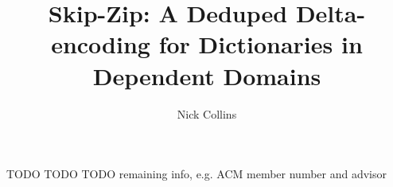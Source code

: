 \documentclass[nonacm]{acmart}
\theoremstyle{slplain}
\numberwithin{thm}{section}
\begin{document}
\title{Skip-Zip: A Deduped Delta-encoding for Dictionaries in Dependent Domains}


\author{Nick Collins}


TODO TODO TODO remaining info, e.g. ACM member number and advisor





\maketitle
\thispagestyle{empty} %
\end{document}
